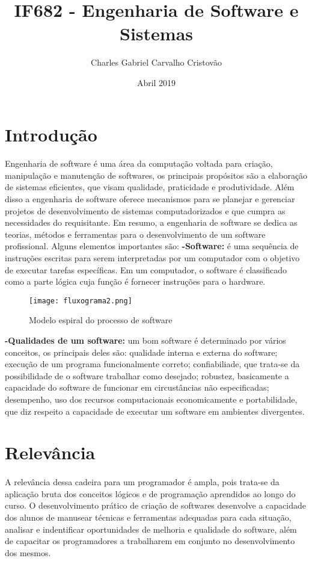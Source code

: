 \documentclass{article}
\title{IF682 - Engenharia de Software e Sistemas}
\author{Charles Gabriel Carvalho Cristovão}
\date{Abril 2019}
\begin{document}
\maketitle

\section{Introdução}
\paragraph{}Engenharia de software é uma área da computação voltada para criação, manipulação e manutenção de softwares, os principais propósitos são a elaboração de sistemas eficientes, que visam qualidade, praticidade e produtividade. Além disso a engenharia de software oferece mecanismos para se planejar e gerenciar projetos de desenvolvimento de sistemas computadorizados e que cumpra as necessidades do requisitante. Em resumo, a engenharia de software se dedica as teorias, métodos e ferramentas para o desenvolvimento de um software profissional.\cite{pagina} Alguns elementos importantes são:\newline
\textbf{-Software:} é uma sequência de instruções escritas para serem interpretadas por um computador com o objetivo de executar tarefas específicas. Em um computador, o software é classificado como a parte lógica cuja função é fornecer instruções para o hardware.\citep{slide1}

\begin{figure}[ht]
    \centering
    \texttt{[image: fluxograma2.png]}
    \caption{Modelo espiral do processo de software}\citep{slide2}
    \label{fig:fluxograma2}
\end{figure}
\newpage
\textbf{-Qualidades de um software:} um bom software é determinado por vários conceitos, os principais deles são: qualidade interna e externa do software; execução de um programa funcionalmente correto; confiabiliade, que trata-se da possibilidade de o software trabalhar como desejado; robustez, basicamente a capacidade do software de funcionar em circustâncias não especificadas; desempenho, uso dos recursos computacionais economicamente e portabilidade, que diz respeito a capacidade de executar um software em ambientes divergentes.\citep{slide3}
\section{Relevância}
\paragraph{}A relevância dessa cadeira para um programador é ampla, pois trata-se da aplicação bruta dos conceitos lógicos e de programação aprendidos ao longo do curso. O desenvolvimento prático de criação de softwares desenvolve a capacidade dos alunos de manusear técnicas e ferramentas adequadas para cada situação, analisar e indentificar oportunidades de melhoria e qualidade do software, além de capacitar os programadores a trabalharem em conjunto no desenvolvimento dos mesmos.
\end{document}
